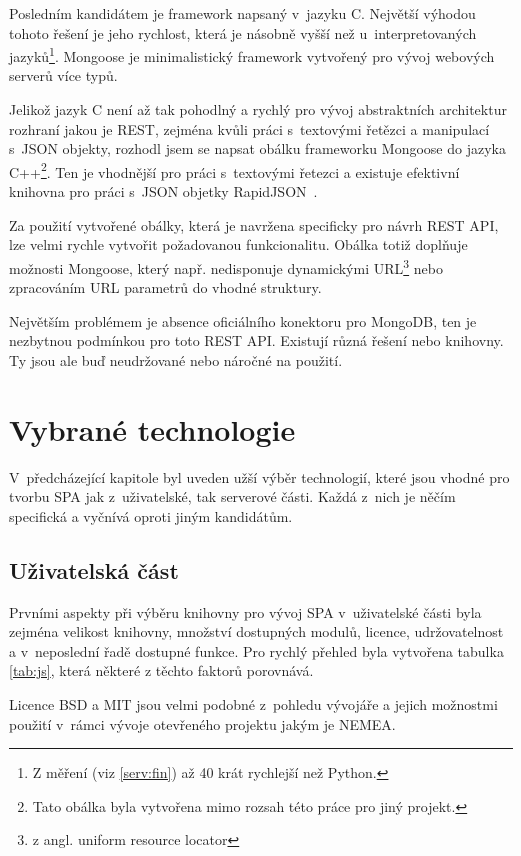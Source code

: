 Posledním kandidátem je framework napsaný v~jazyku C. Největší výhodou tohoto řešení je jeho rychlost, která je násobně vyšší než u~interpretovaných jazyků\footnote{Z měření (viz \ref{serv:fin}) až 40 krát rychlejší než Python.}. Mongoose je minimalistický framework vytvořený pro vývoj webových serverů více typů.

Jelikož jazyk C není až tak pohodlný a rychlý pro vývoj abstraktních architektur rozhraní jakou je REST, zejména kvůli práci s~textovými řetězci a manipulací s~JSON objekty, rozhodl jsem se napsat obálku frameworku Mongoose do jazyka C++\footnote{Tato obálka byla vytvořena mimo rozsah této práce pro jiný projekt.}. Ten je vhodnější pro práci s~textovými řetezci a existuje efektivní knihovna pro práci s~JSON objetky RapidJSON~\cite{js:rjson}.

Za použití vytvořené obálky, která je navržena specificky pro návrh REST API, lze velmi rychle vytvořit požadovanou funkcionalitu. Obálka totiž doplňuje možnosti Mongoose, který např. nedisponuje dynamickými URL\footnote{z angl. uniform resource locator} nebo zpracováním URL parametrů do vhodné struktury.

Největším problémem je absence oficiálního konektoru pro MongoDB, ten je nezbytnou podmínkou pro toto REST API. Existují různá řešení nebo knihovny. Ty jsou ale buď neudržované nebo náročné na použití.

\section{Vybrané technologie}

V~předcházející kapitole byl uveden užší výběr technologií, které jsou vhodné pro tvorbu SPA jak z~uživatelské, tak serverové části. Každá z~nich je něčím specifická a vyčnívá oproti jiným kandidátům.

\subsection{Uživatelská část}

Prvními aspekty při výběru knihovny pro vývoj SPA v~uživatelské části byla zejména velikost knihovny, množství dostupných modulů, licence, udržovatelnost a v~neposlední řadě dostupné funkce. Pro rychlý přehled byla vytvořena tabulka \ref{tab:js}, která některé z těchto faktorů porovnává.

Licence BSD a MIT jsou velmi podobné z~pohledu vývojáře a jejich možnostmi použití v~rámci vývoje otevřeného projektu jakým je NEMEA.

